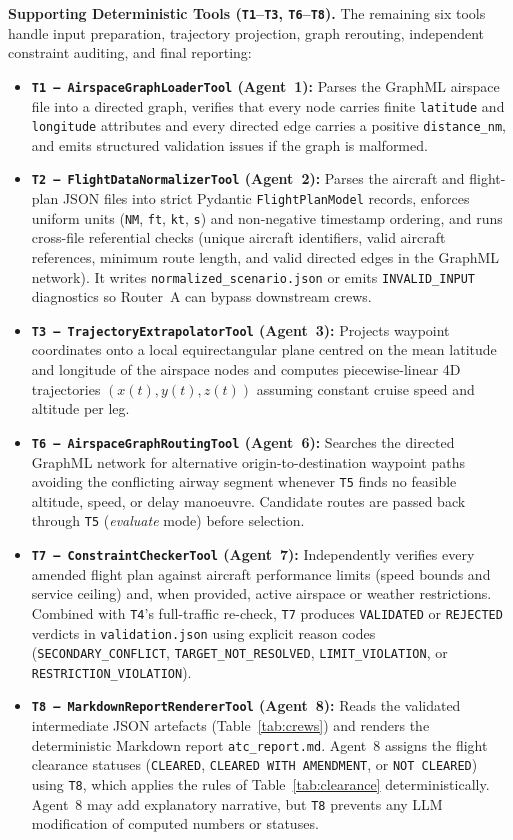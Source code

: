 \textbf{Supporting Deterministic Tools (\texttt{T1}--\texttt{T3}, \texttt{T6}--\texttt{T8}).} The remaining six tools handle input preparation, trajectory projection, graph rerouting, independent constraint auditing, and final reporting:
\begin{itemize}[leftmargin=*]
    \item \textbf{\texttt{T1 -- AirspaceGraphLoaderTool} (Agent~1):} Parses the GraphML airspace file into a directed graph, verifies that every node carries finite \texttt{latitude} and \texttt{longitude} attributes and every directed edge carries a positive \texttt{distance\_nm}, and emits structured validation issues if the graph is malformed.
    \item \textbf{\texttt{T2 -- FlightDataNormalizerTool} (Agent~2):} Parses the aircraft and flight-plan JSON files into strict Pydantic \texttt{FlightPlanModel} records, enforces uniform units (\texttt{NM}, \texttt{ft}, \texttt{kt}, \texttt{s}) and non-negative timestamp ordering, and runs cross-file referential checks (unique aircraft identifiers, valid aircraft references, minimum route length, and valid directed edges in the GraphML network). It writes \texttt{normalized\_scenario.json} or emits \texttt{INVALID\_INPUT} diagnostics so Router~A can bypass downstream crews.
    \item \textbf{\texttt{T3 -- TrajectoryExtrapolatorTool} (Agent~3):} Projects waypoint coordinates onto a local equirectangular plane centred on the mean latitude and longitude of the airspace nodes and computes piecewise-linear 4D trajectories $(x(t), y(t), z(t))$ assuming constant cruise speed and altitude per leg.
    \item \textbf{\texttt{T6 -- AirspaceGraphRoutingTool} (Agent~6):} Searches the directed GraphML network for alternative origin-to-destination waypoint paths avoiding the conflicting airway segment whenever \texttt{T5} finds no feasible altitude, speed, or delay manoeuvre. Candidate routes are passed back through \texttt{T5} (\emph{evaluate} mode) before selection.
    \item \textbf{\texttt{T7 -- ConstraintCheckerTool} (Agent~7):} Independently verifies every amended flight plan against aircraft performance limits (speed bounds and service ceiling) and, when provided, active airspace or weather restrictions. Combined with \texttt{T4}'s full-traffic re-check, \texttt{T7} produces \texttt{VALIDATED} or \texttt{REJECTED} verdicts in \texttt{validation.json} using explicit reason codes (\texttt{SECONDARY\_CONFLICT}, \texttt{TARGET\_NOT\_RESOLVED}, \texttt{LIMIT\_VIOLATION}, or \texttt{RESTRICTION\_VIOLATION}).
    \item \textbf{\texttt{T8 -- MarkdownReportRendererTool} (Agent~8):} Reads the validated intermediate JSON artefacts (Table~\ref{tab:crews}) and renders the deterministic Markdown report \texttt{atc\_report.md}. Agent~8 assigns the flight clearance statuses (\texttt{CLEARED}, \texttt{CLEARED WITH AMENDMENT}, or \texttt{NOT CLEARED}) using \texttt{T8}, which applies the rules of Table~\ref{tab:clearance} deterministically. Agent~8 may add explanatory narrative, but \texttt{T8} prevents any LLM modification of computed numbers or statuses.
\end{itemize}

